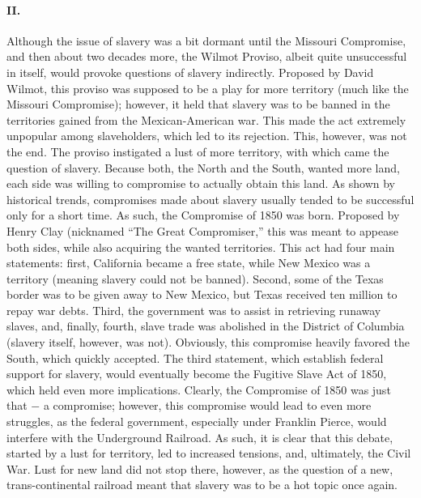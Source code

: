 \documentclass[12pt]{article}
\begin{document}
\paragraph{II.} Although the issue of slavery was a bit dormant until the Missouri Compromise, and then about two decades more, the Wilmot Proviso, albeit quite unsuccessful in itself, would provoke questions of slavery indirectly. Proposed by David Wilmot, this proviso was supposed to be a play for more territory (much like the Missouri Compromise); however, it held that slavery was to be banned in the territories gained from the Mexican-American war. This made the act extremely unpopular among slaveholders, which led to its rejection. This, however, was not the end. The proviso instigated a lust of more territory, with which came the question of slavery. Because both, the North and the South, wanted more land, each side was willing to compromise to actually obtain this land. As shown by historical trends, compromises made about slavery usually tended to be successful only for a short time. As such, the Compromise of 1850 was born. Proposed by Henry Clay (nicknamed ``The Great Compromiser,'' this was meant to appease both sides, while also acquiring the wanted territories. This act had four main statements: first, California became a free state, while New Mexico was a territory (meaning slavery could not be banned). Second, some of the Texas border was to be given away to New Mexico, but Texas received ten million to repay war debts. Third, the government was to assist in retrieving runaway slaves, and, finally, fourth, slave trade was abolished in the District of Columbia (slavery itself, however, was not). Obviously, this compromise heavily favored the South, which quickly accepted. The third statement, which establish federal support for slavery, would eventually become the Fugitive Slave Act of 1850, which held even more implications. Clearly, the Compromise of 1850 was just that $-$ a compromise; however, this compromise would lead to even more struggles, as the federal government, especially under Franklin Pierce, would interfere with the Underground Railroad. As such, it is clear that this debate, started by a lust for territory, led to increased tensions, and, ultimately, the Civil War. Lust for new land did not stop there, however, as the question of a new, trans-continental railroad meant that slavery was to be a hot topic once again.
\end{document}
